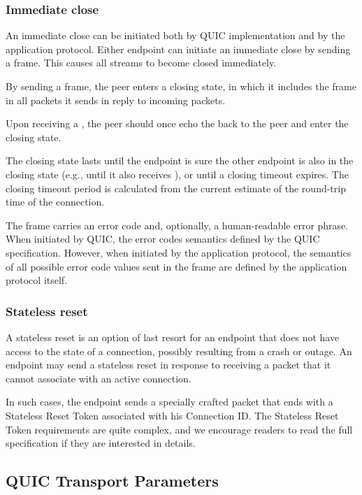 \subsubsection{Immediate close}

An immediate close can be initiated both by QUIC implementation and by the application protocol.
Either endpoint can initiate an immediate close by sending a \CONNECTIONCLOSE{} frame. This causes
all streams to become closed immediately.

By sending a \CONNECTIONCLOSE{} frame, the peer enters a closing state, in which it includes the
\CONNECTIONCLOSE{} frame in all packets it sends in reply to incoming packets.

Upon receiving a \CONNECTIONCLOSE{}, the peer should once echo the \CONNECTIONCLOSE{} back to the
peer and enter the closing state.

The closing state lasts until the endpoint is sure the other endpoint is also in the closing state
(e.g., until it also receives \CONNECTIONCLOSE{}), or until a closing timeout expires. The closing
timeout period is calculated from the current estimate of the round-trip time of the connection.

The \CONNECTIONCLOSE{} frame carries an error code and, optionally, a human-readable error phrase.
When initiated by QUIC, the error codes semantics defined by the QUIC specification. However, when
initiated by the application protocol, the semantics of all possible error code values sent in the
frame are defined by the application protocol itself.

\subsubsection{Stateless reset}

A stateless reset is an option of last resort for an endpoint that does not have access to the state
of a connection, possibly resulting from a crash or outage. An endpoint may send a stateless reset
in response to receiving a packet that it cannot associate with an active connection.

In such cases, the endpoint sends a specially crafted packet that ends with a Stateless Reset Token
associated with his Connection ID\@. The Stateless Reset Token requirements are quite complex, and
we encourage readers to read the full specification if they are interested in details. 

\subsection{QUIC Transport Parameters}\label{sec:02-transport-parameters}

